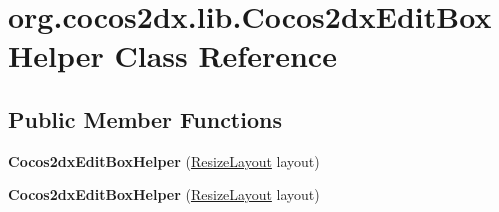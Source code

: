 \hypertarget{classorg_1_1cocos2dx_1_1lib_1_1Cocos2dxEditBoxHelper}{}\section{org.\+cocos2dx.\+lib.\+Cocos2dx\+Edit\+Box\+Helper Class Reference}
\label{classorg_1_1cocos2dx_1_1lib_1_1Cocos2dxEditBoxHelper}
\subsection*{Public Member Functions}
\begin{DoxyCompactItemize}
\item 
\mbox{\label{classorg_1_1cocos2dx_1_1lib_1_1Cocos2dxEditBoxHelper_a69f806fe03d40e40a5f26b19ff514ea8}} 
{\bfseries Cocos2dx\+Edit\+Box\+Helper} (\hyperlink{classorg_1_1cocos2dx_1_1lib_1_1ResizeLayout}{Resize\+Layout} layout)
\item 
\mbox{\label{classorg_1_1cocos2dx_1_1lib_1_1Cocos2dxEditBoxHelper_a69f806fe03d40e40a5f26b19ff514ea8}} 
{\bfseries Cocos2dx\+Edit\+Box\+Helper} (\hyperlink{classorg_1_1cocos2dx_1_1lib_1_1ResizeLayout}{Resize\+Layout} layout)
\end{DoxyCompactItemize}
